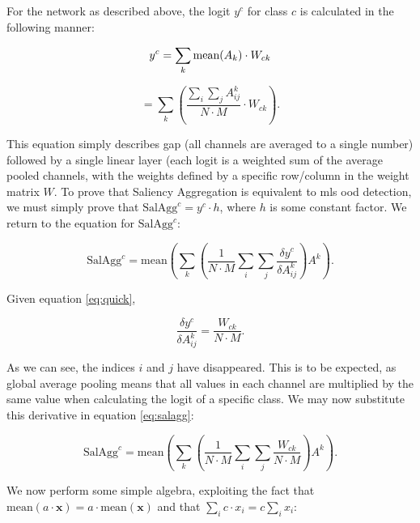 \documentclass[UKenglish]{uiomasterthesis} %
\theoremstyle{definition}
\begin{document}
For the network as described above, the logit $y^c$ for class $c$ is calculated in the following manner:

\begin{equation}
    y^c = \sum_k \text{mean}(A_k) \cdot W_{ck} \\
\end{equation}

\begin{equation} \label{eq:quick}
    = \sum_k \left( \frac{\sum_i \sum_j A^k_{ij}}{N \cdot M} \cdot W_{ck} \right) .
\end{equation}

This equation simply describes \ac{gap} (all channels are averaged to a single number) followed by a single linear layer (each logit is a weighted sum of the average pooled channels, with the weights defined by a specific row/column in the weight matrix $W$. To prove that Saliency Aggregation is equivalent to \ac{mls} \ac{ood} detection, we must simply prove that $\text{SalAgg}^c = y^c \cdot h$, where $h$ is some constant factor. We return to the equation for $\text{SalAgg}^c$:

\begin{equation} \label{eq:salagg}
    \text{SalAgg}^c = \text{mean} \left(\sum_k \left( \frac{1}{N \cdot M} \sum_i \sum_j \frac{\delta y^c}{\delta A_{ij}^k} \right) A^k \right).
\end{equation}

Given equation \ref{eq:quick},

\begin{equation}
    \frac{\delta y^c}{\delta A^k_{ij}} = \frac{W_{ck}}{N \cdot M}.
\end{equation}

As we can see, the indices $i$ and $j$ have disappeared. This is to be expected, as global average pooling means that all values in each channel are multiplied by the same value when calculating the logit of a specific class. We may now substitute this derivative in equation \ref{eq:salagg}:

\begin{equation}
    \text{SalAgg}^c = \text{mean} \left(\sum_k \left( \frac{1}{N \cdot M} \sum_i \sum_j \frac{W_{ck}}{N \cdot M} \right) A^k \right).
\end{equation}

We now perform some simple algebra, exploiting the fact that $\text{mean}(a \cdot \bm{x}) = a \cdot \text{mean}(\bm{x})$ and that $\sum_i c \cdot x_i = c \sum_i x_i$:
\end{document}
